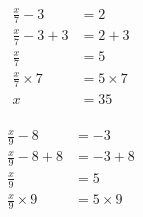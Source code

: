 \documentclass[12pt]{article}
\newcounter{minipagecount}
\begin{document}
\begin{multicols}{2}
\begin{minipage}[t]{0.45\textwidth}
\end{minipage} %
\noindent{(\theminipagecount)}\hspace{0.1mm} %
\begin{minipage}[t]{0.45\textwidth} %
    \vspace{-26pt}  %
    \raggedright %
    \begin{align*} %
        \frac{x}{7} - 3 &= 2\\
        \frac{x}{7} - 3 + 3 &= 2 + 3\\
        \frac{x}{7} &= 5\\
        \frac{x}{7} \times7 &= 5 \times7\\
        x &= 35\\
    \end{align*}
\end{minipage} %
\noindent{(\theminipagecount)}\hspace{0.1mm} %
\begin{minipage}[t]{0.45\textwidth} %
    \vspace{-26pt}  %
    \raggedright %
    \begin{align*} %
        \frac{x}{9} - 8 &= -3\\
        \frac{x}{9} - 8 + 8 &= -3 + 8\\
        \frac{x}{9} &= 5\\
        \frac{x}{9} \times9 &= 5 \times9\\

\end{align*}
\end{minipage}
\end{multicols}
\end{document}
